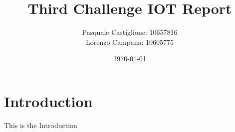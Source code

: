 \documentclass[12pt,a4paper]{article}
\begin{document}
\title{\textbf{Third Challenge IOT Report}}
\author{Pasquale Castiglione: 10657816 \\ Lorenzo Campana: 10605775}
\date{\today}
\maketitle

\section{Introduction}
This is the Introduction
\end{document}
